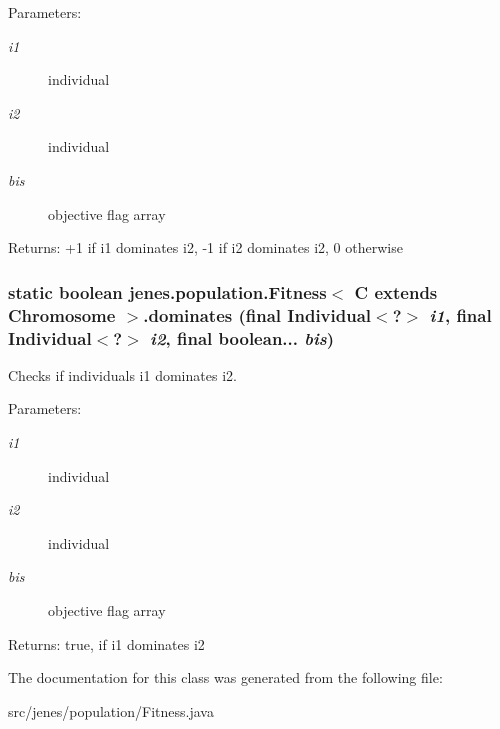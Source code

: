 \begin{Desc}
\item[Parameters:]
\begin{description}
\item[{\em i1}]individual \item[{\em i2}]individual \item[{\em bis}]objective flag array \end{description}
\end{Desc}
\begin{Desc}
\item[Returns:]+1 if i1 dominates i2, -1 if i2 dominates i2, 0 otherwise \end{Desc}
\hypertarget{classjenes_1_1population_1_1_fitness_3_01_c_01extends_01_chromosome_01_4_86b15569d72a9b78c7324ee344ef3dcd}{
\subsubsection[dominates]{\setlength{\rightskip}{0pt plus 5cm}static boolean jenes.population.Fitness$<$ C extends Chromosome $>$.dominates (final Individual$<$?$>$ {\em i1}, \/  final Individual$<$?$>$ {\em i2}, \/  final boolean... {\em bis})}}
\label{classjenes_1_1population_1_1_fitness_3_01_c_01extends_01_chromosome_01_4_86b15569d72a9b78c7324ee344ef3dcd}


Checks if individuals i1 dominates i2.

\begin{Desc}
\item[Parameters:]
\begin{description}
\item[{\em i1}]individual \item[{\em i2}]individual \item[{\em bis}]objective flag array \end{description}
\end{Desc}
\begin{Desc}
\item[Returns:]true, if i1 dominates i2 \end{Desc}


The documentation for this class was generated from the following file:\begin{CompactItemize}
\item 
src/jenes/population/Fitness.java\end{CompactItemize}
